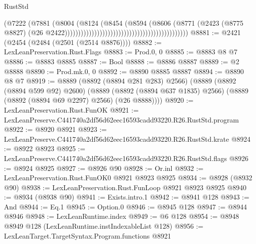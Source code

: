 \begin{lexlean}{RustStd}
\begin{coremodule}
                                                                            (@7222
                                                                              (@7881
                                                                                (@8004
                                                                                  (@8124
                                                                                    (@8454
                                                                                      (@8594
                                                                                        (@8606
                                                                                          (@8771
                                                                                            (@2423
                                                                                              (@8775
                                                                                                @8827)
                                                                                              (@26
                                                                                                @2422))))))))))))))))))))))))))))))))))))))))))))))
@8881 := @2421 (@2454 (@2484 (@2501 (@2514 @8876))))
@8882 := LexLeanPreservation.Rust.Flags
@8883 := Prod.{0, 0}
@8885 := @8883 @8 @7
@8886 := @8883 @8885
@8887 := Bool
@8888 := @8886 @8887
@8889 := @2 @8888
@8890 := Prod.mk.{0, 0}
@8892 := @8890 @8885 @8887
@8894 := @8890 @8 @7
@8919 := @8889
    (@8892 (@8894 @281 @283) @2566)
    (@8889
      (@8892 (@8894 @599 @92) @2600)
      (@8889 (@8892 (@8894 @637 @1835) @2566) (@8889 (@8892 (@8894 @69 @2297) @2566) (@26 @8888))))
@8920 := LexLeanPreservation.Rust.FunOK
@8921 := LexLeanPreserve.C441740a2df56d62eec16593cadd93220.R26.RustStd.program
@8922 := @8920 @8921
@8923 := LexLeanPreserve.C441740a2df56d62eec16593cadd93220.R26.RustStd.krate
@8924 := @8922 @8923
@8925 := LexLeanPreserve.C441740a2df56d62eec16593cadd93220.R26.RustStd.flags
@8926 := @8924 @8925
@8927 := @8926 @90
@8928 := Or.inl
@8932 := LexLeanPreservation.Rust.FunOK0 @8921 @8923 @8925
@8934 := @8928 (@8932 @90)
@8938 := LexLeanPreservation.Rust.FunLoop @8921 @8923 @8925
@8940 := @8934 (@8938 @90)
@8941 := Exists.intro.{1}
@8942 := @8941 @128
@8943 := And
@8944 := Eq.{1}
@8945 := Option.{0}
@8946 := @8945 @128
@8947 := @8944 @8946
@8948 := LexLeanRuntime.index
@8949 := @6 @128
@8954 := @8948 @8949 @128 (LexLeanRuntime.instIndexableList @128)
@8956 := LexLeanTarget.TargetSyntax.Program.functions @8921

\end{coremodule}
\end{lexlean}
